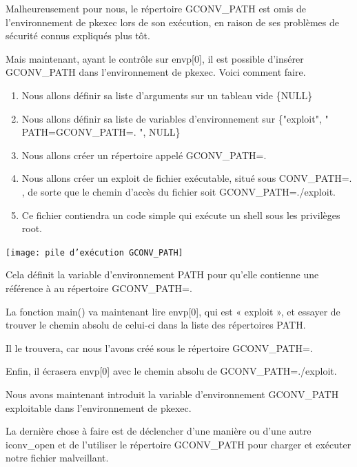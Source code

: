 \documentclass[12pt,a4paper]{article}
\begin{document}
\begin{flushleft}
            \item Malheureusement pour nous, le répertoire GCONV\_PATH est omis de l’environnement de pkexec lors de son exécution, en raison de ses problèmes de sécurité connus expliqués plus tôt.
            \item Mais maintenant, ayant le contrôle sur envp[0], il est possible d'insérer GCONV\_PATH dans l'environnement de pkexec. Voici comment faire.
            \begin{enumerate}
                \item Nous allons définir sa liste d’arguments sur un tableau vide \{NULL\}
                \item Nous allons définir sa liste de variables d’environnement sur \{"exploit", " PATH=GCONV\_PATH=. ", NULL\}
                \item Nous allons créer un répertoire appelé GCONV\_PATH=.
                \item Nous allons créer un exploit de fichier exécutable, situé sous CONV\_PATH=. , de sorte que le chemin d’accès du fichier soit GCONV\_PATH=./exploit.
                \item Ce fichier contiendra un code simple qui exécute un shell sous les privilèges root.
            \end{enumerate}
            \begin{center}
                \texttt{[image: pile d'exécution GCONV\_PATH]} \cite{CVE2021425:online}
            \end{center}
            \item Cela définit la variable d’environnement PATH pour qu’elle contienne une référence à au répertoire GCONV\_PATH=. 
            \item La fonction main() va maintenant lire envp[0], qui est « exploit », et essayer de trouver le chemin absolu de celui-ci dans la liste des répertoires PATH. 
            \item Il le trouvera, car nous l’avons créé sous le répertoire GCONV\_PATH=. 
            \item Enfin, il écrasera envp[0] avec le chemin absolu de GCONV\_PATH=./exploit.
            \item Nous avons maintenant introduit la variable d’environnement GCONV\_PATH exploitable dans l’environnement de pkexec. 
            \item La dernière chose à faire est de déclencher d’une manière ou d’une autre iconv\_open et de l’utiliser le répertoire GCONV\_PATH pour charger et exécuter notre fichier malveillant.

\end{flushleft}
\end{document}
